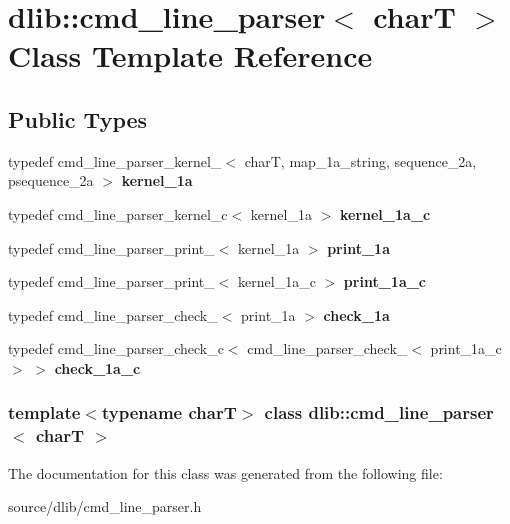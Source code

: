 \hypertarget{classdlib_1_1cmd__line__parser}{
\section{dlib::cmd\_\-line\_\-parser$<$ charT $>$ Class Template Reference}
\label{classdlib_1_1cmd__line__parser}
}
\subsection*{Public Types}
\begin{DoxyCompactItemize}
\item 
\hypertarget{classdlib_1_1cmd__line__parser_a5b27a4d9d3a074860a7bfc57d85f1d32}{
typedef cmd\_\-line\_\-parser\_\-kernel\_$<$ charT, map\_\-1a\_\-string, sequence\_\-2a, psequence\_\-2a $>$ {\bfseries kernel\_\-1a}}
\label{classdlib_1_1cmd__line__parser_a5b27a4d9d3a074860a7bfc57d85f1d32}

\item 
\hypertarget{classdlib_1_1cmd__line__parser_a38a8f350b37b240cbe79ef1e69afc0fd}{
typedef cmd\_\-line\_\-parser\_\-kernel\_\-c$<$ kernel\_\-1a $>$ {\bfseries kernel\_\-1a\_\-c}}
\label{classdlib_1_1cmd__line__parser_a38a8f350b37b240cbe79ef1e69afc0fd}

\item 
\hypertarget{classdlib_1_1cmd__line__parser_a061a11289be9d6b9d0ba4791608ce2f5}{
typedef cmd\_\-line\_\-parser\_\-print\_$<$ kernel\_\-1a $>$ {\bfseries print\_\-1a}}
\label{classdlib_1_1cmd__line__parser_a061a11289be9d6b9d0ba4791608ce2f5}

\item 
\hypertarget{classdlib_1_1cmd__line__parser_a092fed2a65b5e25ae36dfdc875e59ee4}{
typedef cmd\_\-line\_\-parser\_\-print\_$<$ kernel\_\-1a\_\-c $>$ {\bfseries print\_\-1a\_\-c}}
\label{classdlib_1_1cmd__line__parser_a092fed2a65b5e25ae36dfdc875e59ee4}

\item 
\hypertarget{classdlib_1_1cmd__line__parser_a028842bc91b63086a31bdafce3576586}{
typedef cmd\_\-line\_\-parser\_\-check\_$<$ print\_\-1a $>$ {\bfseries check\_\-1a}}
\label{classdlib_1_1cmd__line__parser_a028842bc91b63086a31bdafce3576586}

\item 
\hypertarget{classdlib_1_1cmd__line__parser_af9221ba7331710e527346c7368ee5628}{
typedef cmd\_\-line\_\-parser\_\-check\_\-c$<$ cmd\_\-line\_\-parser\_\-check\_$<$ print\_\-1a\_\-c $>$ $>$ {\bfseries check\_\-1a\_\-c}}
\label{classdlib_1_1cmd__line__parser_af9221ba7331710e527346c7368ee5628}

\end{DoxyCompactItemize}
\subsubsection*{template$<$typename charT$>$ class dlib::cmd\_\-line\_\-parser$<$ charT $>$}



The documentation for this class was generated from the following file:\begin{DoxyCompactItemize}
\item 
source/dlib/cmd\_\-line\_\-parser.h\end{DoxyCompactItemize}
